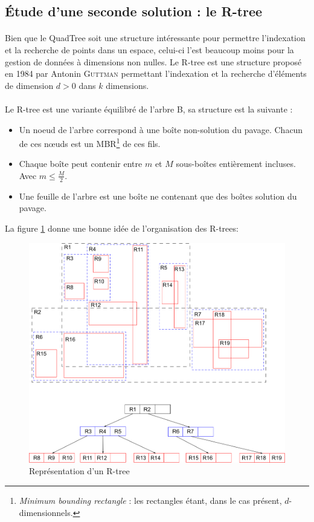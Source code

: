 \subsection{\'Etude d'une seconde solution : le R-tree}
\paragraph{}Bien que le QuadTree soit une structure intéressante pour permettre l'indexation et la recherche de points dans un espace, celui-ci l'est beaucoup moins pour la gestion de données à dimensions non nulles. Le R-tree est une structure proposé en 1984 par Antonin \textsc{Guttman} permettant l'indexation et la recherche d'éléments de dimension $d > 0$ dans $k$ dimensions\cite{Guttman}.

\paragraph{}Le R-tree est une variante équilibré de l'arbre B, sa structure est la suivante :
\begin{itemize}
 \item Un noeud de l'arbre correspond à une boîte non-solution du pavage. Chacun de ces nœuds est un MBR\footnote{\og \emph{Minimum bounding rectangle}\fg{} : les rectangles étant, dans le cas présent, $d$-dimensionnels.} de ces fils.
 \item Chaque boîte peut contenir entre $m$ et $M$ sous-boîtes entièrement incluses. Avec $m\leq \frac{M}{2}$.
 \item Une feuille de l'arbre est une boîte ne contenant que des boîtes solution du pavage.
\end{itemize}

La figure \ref{fig:rtree} donne une bonne idée de l'organisation des R-trees:
\begin{figure}[htbp]
\centering
\includegraphics[scale=0.50]{img/rtree}
\caption{Représentation d'un R-tree\cite{wiki}}
\label{fig:rtree}
\end{figure}

